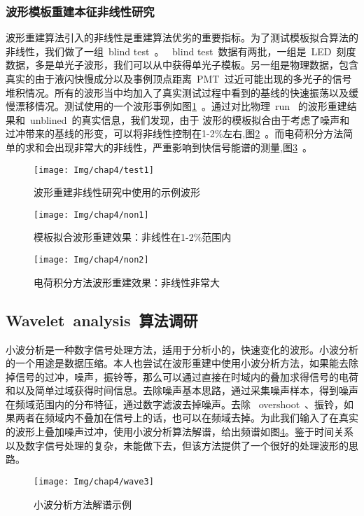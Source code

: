 \subsubsection{波形模板重建本征非线性研究}
波形重建算法引入的非线性是重建算法优劣的重要指标。为了测试模板拟合算法的非线性，我们做了一组~blind test~。
~blind test~数据有两批，一组是~LED~刻度数据，多是单光子波形，我们可以从中获得单光子模板。另一组是物理数据，包含真实的由于液闪快慢成分以及事例顶点距离~PMT~过近可能出现的多光子的信号堆积情况。所有的波形当中均加入了真实测试过程中看到的基线的快速振荡以及缓慢漂移情况。测试使用的一个波形事例如图\ref{fig:test1}~。通过对比物理~run~ 的波形重建结果和~unblined~的真实信息，我们发现，由于
波形的模板拟合由于考虑了噪声和过冲带来的基线的形变，可以将非线性控制在1-2\%左右,图\ref{fig:non1}~。而电荷积分方法简单的求和会出现非常大的非线性，严重影响到快信号能谱的测量,图\ref{fig:non2}~。
\begin{figure}[!htbp]
  \centering
   \texttt{[image: Img/chap4/test1]}
    \caption{波形重建非线性研究中使用的示例波形}
  \label{fig:test1}
\end{figure}
\begin{figure}[!htbp]
  \centering
   \texttt{[image: Img/chap4/non1]}
    \caption{模板拟合波形重建效果：非线性在1-2\%范围内}
  \label{fig:non1}
\end{figure}
\begin{figure}[!htbp]
  \centering
   \texttt{[image: Img/chap4/non2]}
    \caption{电荷积分方法波形重建效果：非线性非常大}
  \label{fig:non2}
\end{figure}
\subsection{Wavelet~analysis~算法调研}
小波分析是一种数字信号处理方法，适用于分析小的，快速变化的波形。小波分析的一个用途是数据压缩。本人也尝试在波形重建中使用小波分析方法，如果能去除掉信号的过冲，噪声，振铃等，那么可以通过直接在时域内的叠加求得信号的电荷和以及简单过域获得时间信息。去除噪声基本思路，通过采集噪声样本，得到噪声在频域范围内的分布特征，通过数字滤波去掉噪声。去除~
overshoot~、振铃，如果两者在频域内不叠加在信号上的话，也可以在频域去掉。为此我们输入了在真实的波形上叠加噪声过冲，使用小波分析算法解谱，给出频谱如图\ref{fig:wave3}。鉴于时间关系以及数字信号处理的复杂，未能做下去，但该方法提供了一个很好的处理波形的思路。
\begin{figure}[!htbp]
  \centering
   \texttt{[image: Img/chap4/wave3]}
    \caption{小波分析方法解谱示例}
  \label{fig:wave3}
\end{figure}

